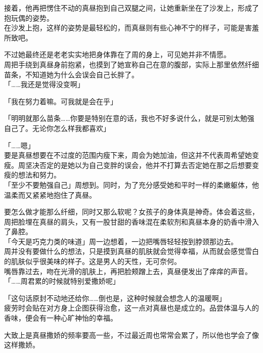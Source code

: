 接着，他再把愣住不动的真昼抱到自己双腿之间，让她重新坐在了沙发上，形成了抱玩偶的姿势。\\

在沙发上抱，这样的姿势是最轻松的，而真昼则有些心神不宁的样子，可能是害羞所致吧。

不过她最终还是老老实实地把身体靠在了周的身上，可见她并非不情愿。\\

周把手绕到真昼身前抱紧，也摸到了她宣称自己在意的腹部，实际上那里依然纤细苗条，不知道她为什么会误会自己长胖了。\\

「……我还是觉得没变啊」

「我在努力着嘛。可我就是会在乎」

「明明就那么苗条……你要是特别在意的话，我也不好多说什么，就是可别太勉强自己了。无论你怎么样我都喜欢」

「……嗯」\\

要是真昼想要在不过度的范围内瘦下来，周会为她加油，但这并不代表周希望她变瘦。周坚决否定的是她以为自己变胖的误会，他并不打算去否定她在那之后想要变瘦的想法和努力。\\

「至少不要勉强自己」周想到。同时，为了充分感受她和平时一样的柔嫩躯体，他温柔而又紧紧地抱住了真昼。

要怎么做才能那么纤细，同时又那么软呢？女孩子的身体真是神奇。体会着这些，周把脸埋在真昼的肩头，又有一股甘甜的香味混在柔软剂和真昼本身的奶香中滑入了鼻腔。\\

「今天是巧克力类的味道」周一边想着，一边把嘴唇轻轻按到脖颈那边去。\\

周并没有要做什么的想法，只是摸到真昼的肌肤就会觉得幸福，从而就会感觉雪白的肌肤似乎很美味的样子。这是男人的天性，无可奈何。\\

嘴唇靠过去，吻在光滑的肌肤上，再把脸颊蹭上去，真昼便发出了痒痒的声音。\\

「……周君累的时候就特别爱撒娇呢」

「这句话原封不动地还给你……倒也是，这种时候就会想念人的温暖啊」\\

疲劳时会贴在对方身上企图获得治愈，这一点对真昼也是成立的。品尝体温与人的香味，便会有一种心旷神怡的幸福。

大致上是真昼撒娇的频率要高一些，不过最近周也常常会累了，所以他也学会了像这样撒娇。\\

